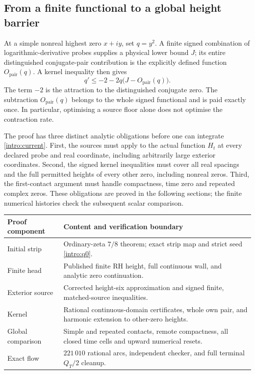 \documentclass[11pt,a4paper]{article}
\theoremstyle{definition}
\theoremstyle{remark}
\begin{document}
\subsection{From a finite functional to a global height barrier}
At a simple nonreal highest zero $x+iy$, set $q=y^2$.
A finite signed combination of logarithmic-derivative probes supplies
a physical lower bound $J$; its entire distinguished conjugate-pair
contribution is the explicitly defined function $O_{\mathrm{pair}}(q)$. A kernel inequality then gives
\begin{equation}\label{intro:current}
 q'\le -2-2q\bigl(J-O_{\mathrm{pair}}(q)\bigr).
\end{equation}
The term $-2$ is the attraction to the distinguished conjugate zero.
The subtraction $O_{\mathrm{pair}}(q)$ belongs to the whole signed functional and is
paid exactly once. In particular, optimising a source floor alone
does not optimise the contraction rate.

The proof has three distinct analytic obligations before one can
integrate \eqref{intro:current}. First, the sources must apply to
the actual function $H_t$ at every declared probe and real coordinate,
including arbitrarily large exterior coordinates. Second, the signed
kernel inequalities must cover all real spacings and the full permitted
heights of every other zero, including nonreal zeros. Third, the
first-contact argument must handle compactness, time zero and repeated
complex zeros. These obligations are proved in the following sections;
the finite numerical histories check the subsequent scalar comparison.

\begin{center}
\small
\begin{tabularx}{\textwidth}{@{}lX@{}}\toprule
Proof component & Content and verification boundary\\\midrule
Initial strip & Ordinary-zeta $7/8$ theorem; exact strip map
and strict seed \eqref{intro:q0}.\\
Finite head & Published finite RH height, full continuous wall,
and analytic zero continuation.\\
Exterior source & Corrected height-six approximation and
signed finite, matched-source inequalities.\\
Kernel & Rational continuous-domain certificates, whole own pair,
and harmonic extension to other-zero heights.\\
Global comparison & Simple and repeated contacts, remote compactness,
all closed time cells and upward numerical resets.\\
Exact flow & $221\,010$ rational arcs, independent checker,
and full terminal $Q_T/2$ cleanup.\\\bottomrule
\end{tabularx}
\end{center}
\end{document}
